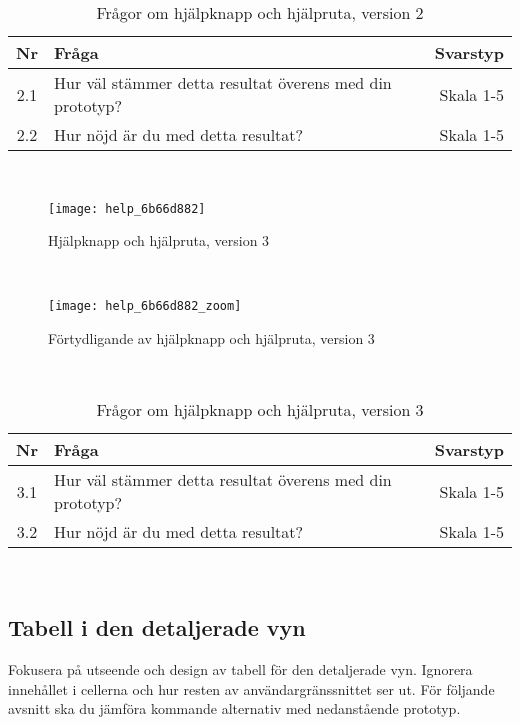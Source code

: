 \begin{table}[h!]
  \caption{Frågor om hjälpknapp och hjälpruta, version 2}
  \def\arraystretch{1.5}
  \begin{adjustbox}{max width=\textwidth}
    \begin{tabularx}{\textwidth}{ | c | X | r |}
      \hline
      \textbf{Nr} & \textbf{Fråga} & \textbf{Svarstyp} \\
      \hline
      2.1 & Hur väl stämmer detta resultat överens med din prototyp? & Skala 1-5 \\
      \hline
      2.2 & Hur nöjd är du med detta resultat? & Skala 1-5 \\
      \hline 
    \end{tabularx}
  \end{adjustbox}
  \label{tab:prototyp_enkat_help_2}
\end{table}
\ 

\begin{figure}[H]
  \centering
  \texttt{[image: help\_6b66d882]}
  \label{fig:help_3}
  \caption{Hjälpknapp och hjälpruta, version 3}
\end{figure}
\ 

\begin{figure}[H]
  \centering
  \texttt{[image: help\_6b66d882\_zoom]}
  \label{fig:help_3_zoom}
  \caption{Förtydligande av hjälpknapp och hjälpruta, version 3}
\end{figure}
\ 

\begin{table}[h!]
  \caption{Frågor om hjälpknapp och hjälpruta, version 3}
  \def\arraystretch{1.5}
  \begin{adjustbox}{max width=\textwidth}
    \begin{tabularx}{\textwidth}{ | c | X | r |}
      \hline
      \textbf{Nr} & \textbf{Fråga} & \textbf{Svarstyp} \\
      \hline
      3.1 & Hur väl stämmer detta resultat överens med din prototyp? & Skala 1-5 \\
      \hline
      3.2 & Hur nöjd är du med detta resultat? & Skala 1-5 \\
      \hline 
    \end{tabularx}
  \end{adjustbox}
  \label{tab:prototyp_enkat_help_3}
\end{table}
\ 

\subsection{Tabell i den detaljerade vyn}
Fokusera på utseende och design av tabell för den detaljerade vyn. Ignorera innehållet i cellerna och hur resten av användargränssnittet ser ut.
För följande avsnitt ska du jämföra kommande alternativ med nedanstående prototyp.


